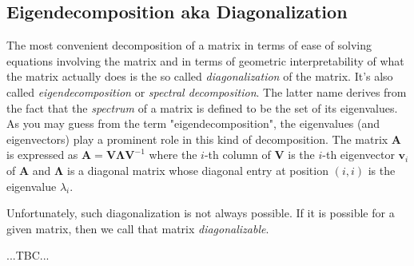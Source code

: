
\subsection{Eigendecomposition aka Diagonalization}
The most convenient decomposition of a matrix in terms of ease of solving equations involving the matrix and in terms of geometric interpretability of what the matrix actually does is the so called \emph{diagonalization} of the matrix. It's also called \emph{eigendecomposition} or \emph{spectral decomposition}. The latter name derives from the fact that the \emph{spectrum} of a matrix is defined to be the set of its eigenvalues. As you may guess from the term "eigendecomposition", the eigenvalues (and eigenvectors) play a prominent role in this kind of decomposition. The matrix $\mathbf{A}$ is expressed as $\mathbf{A} = \mathbf{V} \mathbf{\Lambda} \mathbf{V}^{-1}$ where the $i$-th column of $\mathbf{V}$ is the $i$-th eigenvector $\mathbf{v}_i$ of $\mathbf{A}$ and $\mathbf{\Lambda}$ is a diagonal matrix whose diagonal entry at position $(i,i)$ is the eigenvalue $\lambda_i$. 

Unfortunately, such diagonalization is not always possible. If it is possible for a given matrix, then we call that matrix \emph{diagonalizable}.

...TBC...








